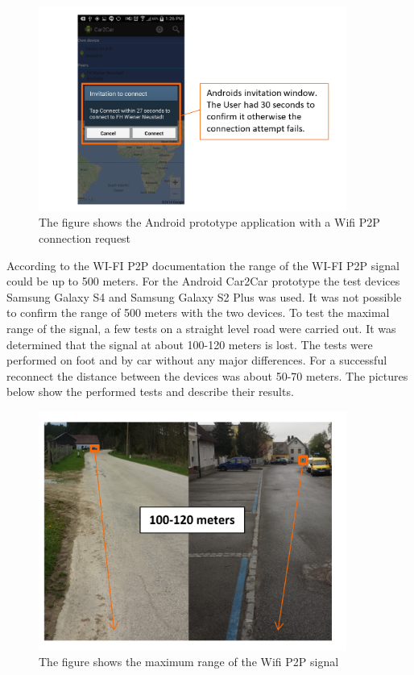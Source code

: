 \begin{figure}[ht]
	\centering
  \includegraphics[width=0.9\textwidth]{images/androidScreen3.png}
	\caption{The figure shows the Android prototype application with a Wifi P2P connection request}
	\label{fig1}
\end{figure}

According to the WI-FI P2P documentation the range of the WI-FI P2P signal could be up to 500 meters. For the Android Car2Car prototype the test devices Samsung Galaxy S4 and Samsung Galaxy S2 Plus was used. It was not possible to confirm the range of 500 meters with the two devices. To test the maximal range of the signal, a few tests on a straight level road were carried out. It was determined that the signal at about 100-120 meters is lost. The tests were performed on foot and by car without any major differences. For a successful reconnect the distance between the devices was about 50-70 meters. The pictures below show the performed tests and describe their results.

\begin{figure}[ht]
	\centering
  \includegraphics[width=0.9\textwidth]{images/androidScreen4.png}
	\caption{The figure shows the maximum range of the Wifi P2P signal}
	\label{fig1}
\end{figure}

